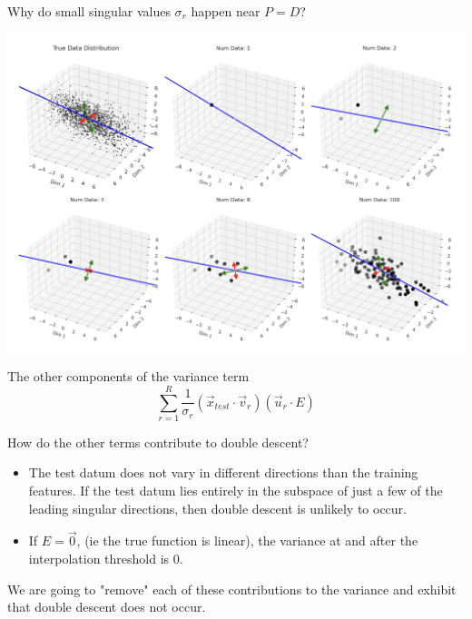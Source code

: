 \documentclass{beamer}
\begin{document}
\begin{frame}{Why do small singular values $\sigma_r$ happen near $P=D$?}
    \begin{center}
        \includegraphics[scale=0.28]{singularvals.png}
    \end{center}
\end{frame}


\begin{frame}{The other components of the variance term}
    \begin{equation*}
        \sum_{r=1}^R \frac{1}{\sigma_r}(\vec{x}_{test} \cdot \vec{v}_r)(\vec{u}_r \cdot E)
    \end{equation*}

    How do the other terms contribute to double descent?

    \begin{itemize}
        \item The test datum does not vary in different directions than the training features. If the test datum lies entirely in the subspace of just a few of the leading singular directions, then double descent is unlikely to occur.
        \item If $E = \vec{0}$, (ie the true function is linear), the variance at and after the interpolation threshold is $0$. 
    \end{itemize}

    \hspace{5cm}
    \pause

    We are going to "remove" each of these contributions to the variance and exhibit that double descent does not occur. 
\end{frame}
\end{document}
